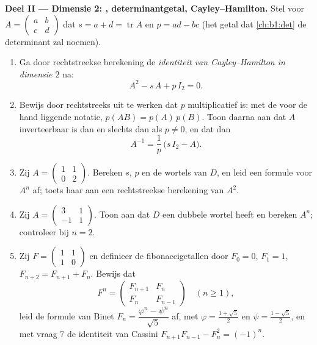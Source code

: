 \begin{problem}
\medskip
\noindent\textbf{Deel II --- Dimensie 2: , determinantgetal,
Cayley--Hamilton.} Stel voor $A = \begin{pmatrix} a & b\\ c &
d\end{pmatrix}$ dat $s = a + d = \operatorname{tr} A$ en $p = ad -
bc$ (het getal dat \cref{ch:b1:det} de determinant zal noemen).
\begin{enumerate}[resume]
  \item Ga door rechtstreekse berekening de \emph{identiteit van
        Cayley--Hamilton in dimensie $2$} na:
        \[
        A^2 - s\,A + p\,I_2 = 0 .
        \]
  \item Bewijs door rechtstreeks uit te werken dat $p$
        multiplicatief is: met de voor de hand liggende notatie,
        $p(AB) = p(A)\,p(B)$. Toon daarna aan dat $A$ inverteerbaar
        is dan en slechts dan als $p \neq 0$, en dat dan
        \[
        A^{-1} = \frac1p\,\bigl(s\,I_2 - A\bigr).
        \]
  \item Zij $A = \begin{pmatrix} 1 & 1\\ 0 & 2\end{pmatrix}$.
        Bereken $s$, $p$ en de wortels van $D$, en leid een 
        formule voor $A^n$ af; toets haar aan een rechtstreekse
        berekening van $A^2$.
  \item Zij $A = \begin{pmatrix} 3 & 1\\ -1 & 1\end{pmatrix}$. Toon
        aan dat $D$ een dubbele wortel heeft en bereken $A^n$;
        controleer bij $n = 2$.
  \item Zij $F = \begin{pmatrix} 1 & 1\\ 1 & 0\end{pmatrix}$ en
        definieer de fibonaccigetallen door $F_0 = 0$, $F_1 = 1$,
        $F_{n+2} = F_{n+1} + F_n$. Bewijs dat
        \[
        F^n = \begin{pmatrix} F_{n+1} & F_n\\ F_n &
        F_{n-1}\end{pmatrix} \quad (n \geq 1),
        \]
        leid de formule van Binet $F_n = \dfrac{\varphi^n -
        \psi^n}{\sqrt5}$ af, met $\varphi = \frac{1 + \sqrt5}2$ en
        $\psi = \frac{1 - \sqrt5}2$, en met vraag 7 de identiteit
        van Cassini $F_{n+1}F_{n-1} - F_n^2 = (-1)^n$.
\end{enumerate}


\end{problem}
